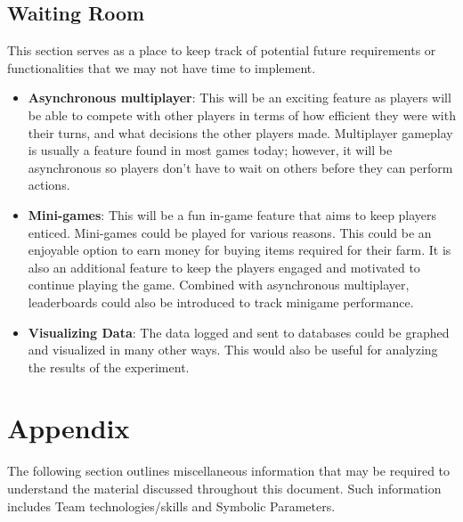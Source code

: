 \documentclass{article}
\begin{document}
\subsection{Waiting Room}
This section serves as a place to keep track of potential future requirements or functionalities that we may not have time to implement.
\begin{itemize}
    
    \item \textbf{Asynchronous multiplayer}: This will be an exciting feature as players will be able to compete with other players in terms of how efficient they were with their turns, and what decisions the other players made. Multiplayer gameplay is usually a feature found in most games today; however, it will be asynchronous so players don't have to wait on others before they can perform actions.
    
    \item \textbf{Mini-games}: This will be a fun in-game feature that aims to keep players enticed. Mini-games could be played for various reasons. This could be an enjoyable option to earn money for buying items required for their farm. It is also an additional feature to keep the players engaged and motivated to continue playing the game. Combined with asynchronous multiplayer, leaderboards could also be introduced to track minigame performance.
    
    \item \textbf{Visualizing Data}: The data logged and sent to databases could be graphed and visualized in many other ways. This would also be useful for analyzing the results of the experiment.
 
\end{itemize}



\newpage



\newpage

\section{Appendix}
The following section outlines miscellaneous information that may be required to understand the material discussed throughout this document. Such information includes Team technologies/skills and Symbolic Parameters.
\end{document}
